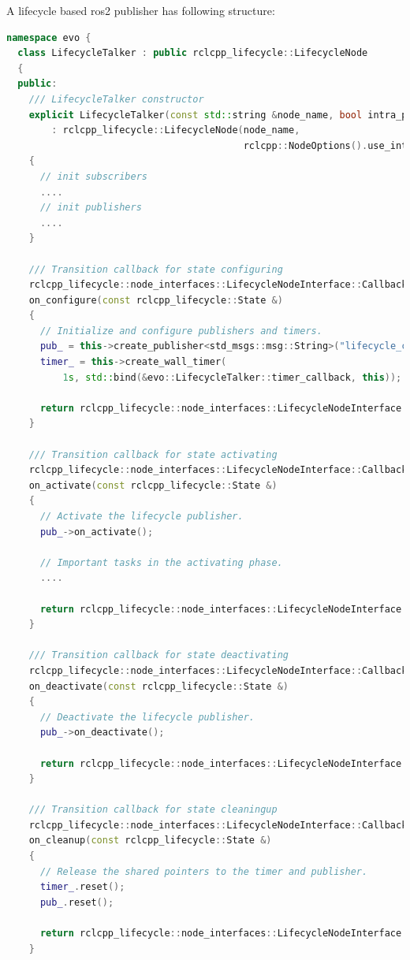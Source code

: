 A lifecycle based ros2 publisher has following structure:
\begin{lstlisting}[language=cpp]
namespace evo {
  class LifecycleTalker : public rclcpp_lifecycle::LifecycleNode
  {
  public:
    /// LifecycleTalker constructor
    explicit LifecycleTalker(const std::string &node_name, bool intra_process_comms = false)
        : rclcpp_lifecycle::LifecycleNode(node_name,
                                          rclcpp::NodeOptions().use_intra_process_comms(intra_process_comms))
    {
      // init subscribers
      ....
      // init publishers
      ....
    }
  
    /// Transition callback for state configuring
    rclcpp_lifecycle::node_interfaces::LifecycleNodeInterface::CallbackReturn
    on_configure(const rclcpp_lifecycle::State &)
    {
      // Initialize and configure publishers and timers.
      pub_ = this->create_publisher<std_msgs::msg::String>("lifecycle_chatter", 10);
	  timer_ = this->create_wall_timer(
          1s, std::bind(&evo::LifecycleTalker::timer_callback, this));

      return rclcpp_lifecycle::node_interfaces::LifecycleNodeInterface::CallbackReturn::SUCCESS;
    }

    /// Transition callback for state activating
    rclcpp_lifecycle::node_interfaces::LifecycleNodeInterface::CallbackReturn
    on_activate(const rclcpp_lifecycle::State &)
    {
      // Activate the lifecycle publisher.
      pub_->on_activate();

      // Important tasks in the activating phase.
	  ....
 
      return rclcpp_lifecycle::node_interfaces::LifecycleNodeInterface::CallbackReturn::SUCCESS;
    }

    /// Transition callback for state deactivating
    rclcpp_lifecycle::node_interfaces::LifecycleNodeInterface::CallbackReturn
    on_deactivate(const rclcpp_lifecycle::State &)
    {
      // Deactivate the lifecycle publisher.
      pub_->on_deactivate();

      return rclcpp_lifecycle::node_interfaces::LifecycleNodeInterface::CallbackReturn::SUCCESS;
    }

    /// Transition callback for state cleaningup
    rclcpp_lifecycle::node_interfaces::LifecycleNodeInterface::CallbackReturn
    on_cleanup(const rclcpp_lifecycle::State &)
    {
      // Release the shared pointers to the timer and publisher. 
      timer_.reset();
      pub_.reset();

      return rclcpp_lifecycle::node_interfaces::LifecycleNodeInterface::CallbackReturn::SUCCESS;
    }


\end{lstlisting}
